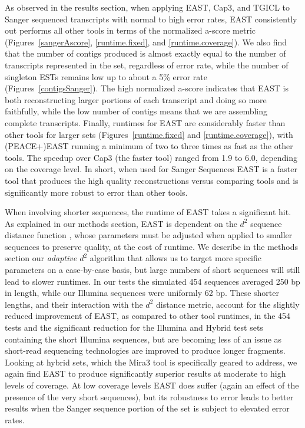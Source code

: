 \documentclass[10pt]{bmc_article}
\newcommand{\peace} {{\small PEACE}}
\newcommand{\capthree} {{\small Cap3}}
\newcommand{\tgicl} {{\small TGICL}}
\newcommand{\east} {{\small EAST}}
\newcommand{\mira}{{\small Mira3}}
\newenvironment{bmcformat}{\begin{raggedright}\baselineskip20pt\sloppy\setboolean{publ}{false}}{\end{raggedright}\baselineskip20pt\sloppy}
\begin{document}
\begin{bmcformat}
As observed in the results section, when applying \east, \capthree,
and \tgicl\/ to Sanger sequenced transcripts with normal to high error
rates, \east\/ consistently out performs all other tools in terms of
the normalized a-score metric (Figures~\ref{sangerAscore},
\ref{runtime.fixed}, and \ref{runtime.coverage}).  We also find that
the number of contigs produced is almost exactly equal to the number
of transcripts represented in the set, regardless of error rate, while
the number of singleton ESTs remains low up to about a 5\% error rate
(Figures~\ref{contigsSanger}).  The high normalized a-score indicates
that \east\/ is both reconstructing larger portions of each transcript
and doing so more faithfully, while the low number of contigs means
that we are assembling complete transcripts.  Finally, runtimes for
\east\/ are considerably faster than other tools for larger sets
(Figures~\ref{runtime.fixed} and \ref{runtime.coverage}), with
(\peace+)\east\/ running a minimum of two to three times as fast as
the other tools.  The speedup over \capthree\/ (the faster tool)
ranged from 1.9 to 6.0, depending on the coverage level.  In short,
when used for Sanger Sequences \east\/ is a faster tool that produces
the high quality reconstructions versus comparing tools and is
significantly more robust to error than other tools.

\vspace{3mm}

When involving shorter sequences, the runtime of \east\/ takes a
significant hit.  As explained in our methods section, \east\/ is
dependent on the $d^2$ sequence distance function \cite{Hide94}, whose
parameters must be adjusted when applied to smaller sequences to
preserve quality, at the cost of runtime.  We describe in the methods
section our {\it adaptive $d^2$} algorithm that allows us to target
more specific parameters on a case-by-case basis, but large numbers of
short sequences will still lead to slower runtimes.  In our tests the
simulated 454 sequences averaged 250 bp in length, while our Illumina
sequences were uniformly 62 bp.  These shorter lengths, and their
interaction with the $d^2$ distance metric, account for the slightly
reduced improvement of \east, as compared to other tool runtimes, in
the 454 tests and the significant reduction for the Illumina and
Hybrid test sets containing the short Illumina sequences, but are
becoming less of an issue as short-read sequencing technologies are
improved to produce longer fragments.  Looking at hybrid sets, which
the \mira\/ tool is specifically geared to address, we again find
\east\/ to produce significantly superior results at moderate to high
levels of coverage.  At low coverage levels \east\/ does suffer (again
an effect of the presence of the very short sequences), but its
robustness to error leads to better results when the Sanger sequence
portion of the set is subject to elevated error rates.


\end{bmcformat}
\end{document}

